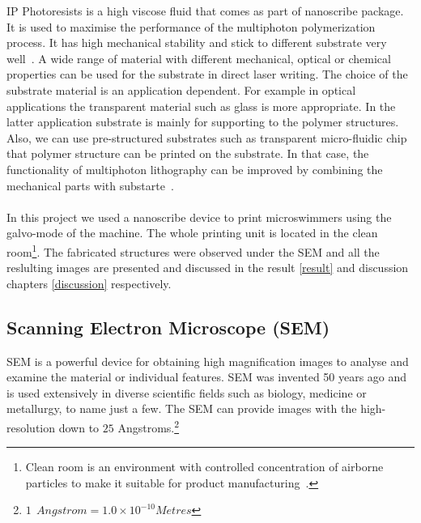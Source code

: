 \documentclass[12pt,a4paper,titlepage]{report}
\begin{document}
IP Photoresists is a high viscose fluid that comes as part of nanoscribe package. It is
 used to maximise the performance of the multiphoton polymerization process. It has high 
mechanical stability and stick to different substrate very well~\citep{Doe:2014Feb:Online}. A wide
 range of material with different mechanical, optical or chemical properties can be used for the substrate 
in direct laser writing. The choice of the substrate material is an application dependent. For example in 
optical applications the transparent material such as glass is more appropriate. In the latter application 
substrate is mainly for supporting to the polymer structures. Also, we can use pre-structured substrates 
such as transparent micro-fluidic chip that polymer structure can be printed on the substrate. In that
 case, the functionality of multiphoton lithography can be improved by combining the mechanical parts 
with substarte~\citep{Doe:2014Feb:Online}.  



\paragraph{}
In this project we used a nanoscribe device to print microswimmers using the galvo-mode of the machine. 
The whole printing unit is located in the clean room\footnote{Clean room is an environment with controlled
  concentration of airborne particles to make it suitable for product manufacturing~\citep{Doe:2014April:Online}. }. 
The fabricated structures were observed under the 
\ac*{SEM} and all the reslulting images are presented and discussed in the result \ref{result} and discussion
chapters \ref{discussion} respectively.


\subsection{Scanning Electron Microscope (\ac*{SEM})}\label{sem}



\ac*{SEM} is a powerful device for obtaining high magnification images to analyse and examine
 the material or individual features. \ac*{SEM} was invented 50 years ago and is used extensively 
in diverse scientific fields such as biology, medicine or metallurgy,  to name just a few. The \ac*{SEM} can 
provide images with the high-resolution down to $25$ Angstroms.\footnote{$1 ~\ Angstrom =
1.0 \times 10^{-10} Metres$}%
\end{document}
